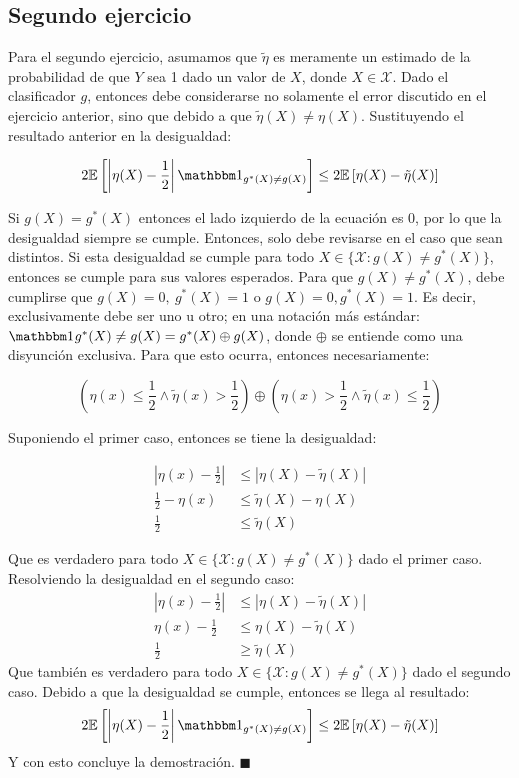 \subsection*{Segundo ejercicio}
Para el segundo ejercicio, asumamos que $\tilde{\eta}$ es meramente un estimado
de la probabilidad de que $Y$ sea 1 dado un valor de $X$, donde $X\in\mathcal{X}$. Dado el clasificador $g$, 
entonces debe considerarse no solamente el error discutido en el ejercicio anterior, 
sino que debido a que $\tilde{\eta}(X) \ne \eta(X)$. 
Sustituyendo el resultado anterior en la desigualdad: 

\begin{equation}
    2\E\left[\left|\eta(X)-\frac{1}{2}\right|\ind[g^*(X)\ne g(X)]\right]\le 2\E\left[\eta(X)-\tilde{\eta}(X)\right]
\end{equation}

Si $g(X) = g^*(X)$ entonces el lado izquierdo de la ecuación es 0, por lo que 
la desigualdad siempre se cumple. Entonces, solo debe revisarse en el caso que 
sean distintos. Si esta desigualdad se cumple para todo $X\in \{\mathcal{X}:g(X)\ne g^*(X)\}$, 
entonces se cumple para sus valores esperados. Para que $g(X)\ne g^*(X)$, debe 
cumplirse que $g(X) = 0,\ g^*(X)=1$ o $g(X) = 0, g^*(X)=1$. Es decir, exclusivamente 
debe ser uno u otro; en una notación más estándar: $\ind{g^*(X)\ne g(X)} = g^*(X)\oplus g(X)$, donde $\oplus$ se entiende como 
una disyunción exclusiva. Para que esto ocurra, entonces necesariamente:

\begin{equation}
    \left(\eta(x)\le \frac{1}{2} \land \tilde{\eta}(x) > \frac{1}{2}\right)\oplus\left(\eta(x) > \frac{1}{2} \land \tilde{\eta}(x)\le \frac{1}{2}\right) 
\end{equation}

Suponiendo el primer caso, entonces se tiene la desigualdad: 

\begin{align}
    \left|\eta(x)-\frac{1}{2}\right| &\le |\eta(X)-\tilde{\eta}(X)| \\
    \frac{1}{2}-\eta(x) &\le \tilde{\eta}(X) - \eta(X) \\
    \frac{1}{2} &\le \tilde{\eta}(X)
\end{align}

Que es verdadero para todo $X\in \{\mathcal{X}:g(X)\ne g^*(X)\}$ dado el primer caso. 
Resolviendo la desigualdad en el segundo caso: 
\begin{align}
    \left|\eta(x)-\frac{1}{2}\right| &\le |\eta(X)-\tilde{\eta}(X)| \\
    \eta(x)-\frac{1}{2} &\le  \eta(X)-\tilde{\eta}(X) \\
    \frac{1}{2} &\ge \tilde{\eta}(X)
\end{align}
Que también es verdadero para todo $X\in \{\mathcal{X}:g(X)\ne g^*(X)\}$ dado el segundo caso. 
Debido a que la desigualdad se cumple, entonces se llega al resultado: 
\begin{equation}
    2\E\left[\left|\eta(X)-\frac{1}{2}\right|\ind[g^*(X)\ne g(X)]\right]\le 2\E\left[\eta(X)-\tilde{\eta}(X)\right]
\end{equation}
Y con esto concluye la demostración. $\blacksquare$
